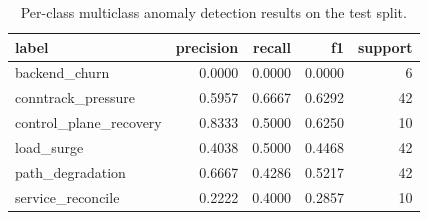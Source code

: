 \begin{table}[t]
\centering
\caption{Per-class multiclass anomaly detection results on the test split.}
\label{tab:phase4_multiclass_per_class}
\begin{tabular}{lrrrr}
\hline
label & precision & recall & f1 & support \\
\hline
backend\_churn & 0.0000 & 0.0000 & 0.0000 & 6 \\
conntrack\_pressure & 0.5957 & 0.6667 & 0.6292 & 42 \\
control\_plane\_recovery & 0.8333 & 0.5000 & 0.6250 & 10 \\
load\_surge & 0.4038 & 0.5000 & 0.4468 & 42 \\
path\_degradation & 0.6667 & 0.4286 & 0.5217 & 42 \\
service\_reconcile & 0.2222 & 0.4000 & 0.2857 & 10 \\
\hline
\end{tabular}
\end{table}
